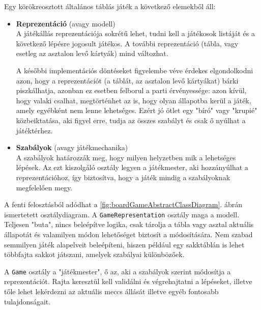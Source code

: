 \documentclass[twoside, a4paper, 12pt]{article}
\begin{document}
Egy körökreosztott általános táblás játék a következő elemekből áll:

\begin{itemize}
	\item \textbf{Reprezentáció} (avagy modell) \\
	A játékállás reprezentációja sokrétű lehet, tudni kell a játékosok listáját és a következő lépésre jogosult játékos. A további reprezentáció (tábla, vagy esetleg az asztalon levő kártyák) mind változhat.

	A későbbi implementációs döntéseket figyelembe véve érdekes elgondolkodni azon, hogy a reprezentációt (a táblát, az asztalon levő kártyákat) bárki piszkálhatja, azonban ez esetben felborul a parti érvényessége: azon kívül, hogy valaki csalhat, megtörténhet az is, hogy olyan állapotba kerül a játék, amely egyébként nem lenne lehetséges. Ezért jó ötlet egy "bíró" vagy "krupié" közbeiktatása, aki figyel erre, tudja az összes szabályt és csak ő nyúlhat a játéktérhez.
	
	\item \textbf{Szabályok} (avagy játékmechanika) \\
	A szabályok határozzák meg, hogy milyen helyzetben mik a lehetséges lépések. Az ezt kiszolgáló osztály legyen a játékmester, aki hozzányúlhat a reprezentációhoz, így biztosítva, hogy a játék mindig a szabályoknak megfelelően megy.
\end{itemize}

A fenti felosztásból adódhat a \ref{fig:boardGameAbstractClassDiagram}. ábrán ismertetett osztálydiagram. A \texttt{GameRepresentation} osztály maga a modell. Teljesen "buta", nincs beleépítve logika, csak tárolja a tábla vagy asztal aktuális állapotát és valamilyen módon lehetőséget biztosít a módosítására. Nem szabad semmilyen játék alapelveit beleépíteni, hiszen például egy sakktáblán is lehet többfajta sakkot játszani, amelyek szabályai különbözőek.

A \texttt{Game} osztály a "játékmester", ő az, aki a szabályok szerint módosítja a reprezentációt. Rajta keresztül kell validálni és végrehajtatni a lépéseket, illetve tőle lehet lekérdezni az aktuális meccs állását illetve egyéb fontosabb tulajdonságait.
\end{document}
